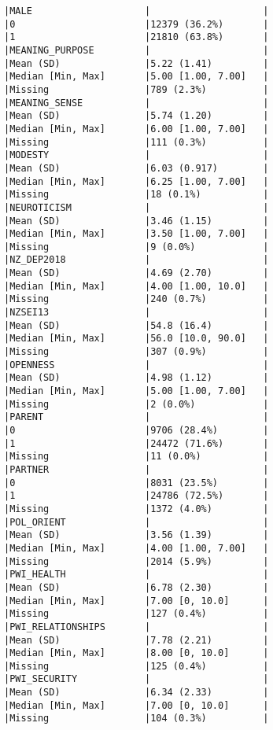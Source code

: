 \documentclass[
  singlecolumn]{report}
\begin{document}
\begin{verbatim}
|MALE                    |                    |
|0                       |12379 (36.2%)       |
|1                       |21810 (63.8%)       |
|MEANING_PURPOSE         |                    |
|Mean (SD)               |5.22 (1.41)         |
|Median [Min, Max]       |5.00 [1.00, 7.00]   |
|Missing                 |789 (2.3%)          |
|MEANING_SENSE           |                    |
|Mean (SD)               |5.74 (1.20)         |
|Median [Min, Max]       |6.00 [1.00, 7.00]   |
|Missing                 |111 (0.3%)          |
|MODESTY                 |                    |
|Mean (SD)               |6.03 (0.917)        |
|Median [Min, Max]       |6.25 [1.00, 7.00]   |
|Missing                 |18 (0.1%)           |
|NEUROTICISM             |                    |
|Mean (SD)               |3.46 (1.15)         |
|Median [Min, Max]       |3.50 [1.00, 7.00]   |
|Missing                 |9 (0.0%)            |
|NZ_DEP2018              |                    |
|Mean (SD)               |4.69 (2.70)         |
|Median [Min, Max]       |4.00 [1.00, 10.0]   |
|Missing                 |240 (0.7%)          |
|NZSEI13                 |                    |
|Mean (SD)               |54.8 (16.4)         |
|Median [Min, Max]       |56.0 [10.0, 90.0]   |
|Missing                 |307 (0.9%)          |
|OPENNESS                |                    |
|Mean (SD)               |4.98 (1.12)         |
|Median [Min, Max]       |5.00 [1.00, 7.00]   |
|Missing                 |2 (0.0%)            |
|PARENT                  |                    |
|0                       |9706 (28.4%)        |
|1                       |24472 (71.6%)       |
|Missing                 |11 (0.0%)           |
|PARTNER                 |                    |
|0                       |8031 (23.5%)        |
|1                       |24786 (72.5%)       |
|Missing                 |1372 (4.0%)         |
|POL_ORIENT              |                    |
|Mean (SD)               |3.56 (1.39)         |
|Median [Min, Max]       |4.00 [1.00, 7.00]   |
|Missing                 |2014 (5.9%)         |
|PWI_HEALTH              |                    |
|Mean (SD)               |6.78 (2.30)         |
|Median [Min, Max]       |7.00 [0, 10.0]      |
|Missing                 |127 (0.4%)          |
|PWI_RELATIONSHIPS       |                    |
|Mean (SD)               |7.78 (2.21)         |
|Median [Min, Max]       |8.00 [0, 10.0]      |
|Missing                 |125 (0.4%)          |
|PWI_SECURITY            |                    |
|Mean (SD)               |6.34 (2.33)         |
|Median [Min, Max]       |7.00 [0, 10.0]      |
|Missing                 |104 (0.3%)          |

\end{verbatim}
\end{document}
